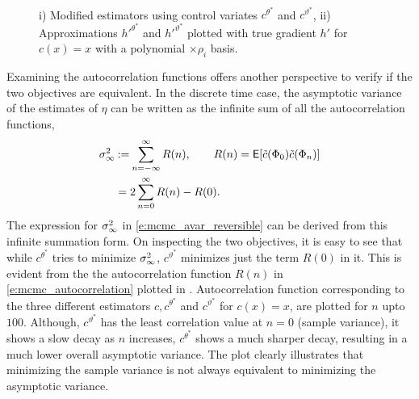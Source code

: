 \begin{figure}[htbp]
	\centering
	\mbox{
		 \quad
	}
	\caption{i) Modified estimators using control variates $c^{\theta^*}$ and $c^{\vartheta^*}$, ii) Approximations $h'^{\theta^*}$ and $h'^{\vartheta^*}$ plotted with true gradient $h'$ for $c(x) =x$ with a polynomial $\times \rho_i$ basis.}
	\label{fig:mcmc_cv_theta_var}
\end{figure}


Examining the autocorrelation functions offers another perspective to verify if the two objectives are equivalent. In the discrete time case, the asymptotic variance of the estimates of $\eta$ can be written as the infinite sum of all the autocorrelation functions,
\begin{equation}
\begin{aligned}
\asymvar^2  & \eqdef \sum_{n=-\infty}^\infty R(n), \qquad R(n) = \Expect [\tilc(\markovstate_0) \tilc(\markovstate_n)] \\
& = 2 \sum_{n=0}^\infty R(n)- R(0).
\end{aligned}
\label{e:mcmc_autocorrelation}
\end{equation}
The expression for $\sigma_\infty^2$ in \eqref{e:mcmc_avar_reversible} can be derived from this infinite summation form. On inspecting the two objectives, it is easy to see that while $c^{\theta^*}$ tries to minimize $\sigma_\infty^2$, $c^{\vartheta^*}$ minimizes just the term $R(0)$ in it. This is evident from the the autocorrelation function $R(n)$ in \eqref{e:mcmc_autocorrelation} plotted in . Autocorrelation function corresponding to the three different estimators $c,c^{\theta^*}$  and $c^{\vartheta^*}$ for $c(x) = x$, are plotted for $n$ upto $100$. Although, $c^{\vartheta^{*}}$ has the least correlation value at $n=0$ (sample variance), it shows a slow decay as $n$ increases, $c^{\theta^*}$ shows a much sharper decay, resulting in a much lower overall asymptotic variance. The plot clearly illustrates that minimizing the sample variance is not always equivalent to minimizing the asymptotic variance.

